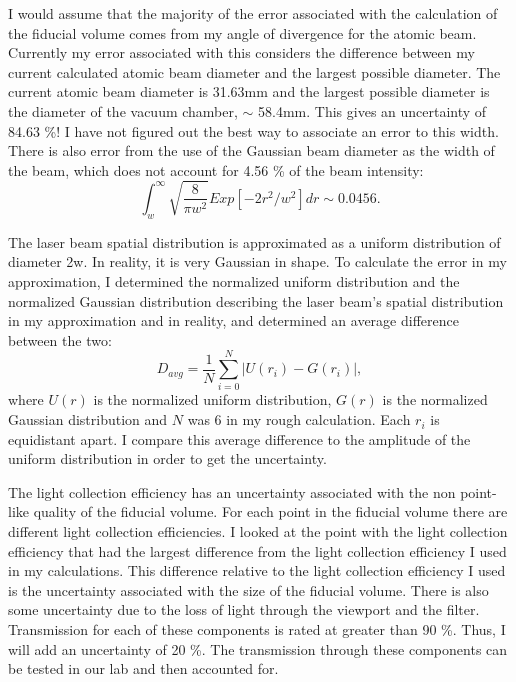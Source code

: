 \documentclass[12pt, a4paper]{article}
\begin{document}
I would assume that the majority of the error associated with the calculation of the fiducial volume comes from my angle of divergence for the atomic beam. Currently my error associated with this considers the difference between my current calculated atomic beam diameter and the largest possible diameter. The current atomic beam diameter is 31.63mm and the largest possible diameter is the diameter of the vacuum chamber, $\sim$ 58.4mm. This gives an uncertainty of 84.63 \%! I have not figured out the best way to associate an error to this width. There is also error from the use of the Gaussian beam diameter as the width of the beam, which does not account for 4.56 \% of the beam intensity:
\begin{equation}
\int_{w}^{\infty} \sqrt{\frac{8}{\pi w^2}} Exp[-2r^2/w^2]dr \sim 0.0456.
\end{equation}

The laser beam spatial distribution is approximated as a uniform distribution of diameter 2w. In reality, it is very Gaussian in shape. To calculate the error in my approximation, I determined the normalized uniform distribution and the normalized Gaussian distribution describing the laser beam's spatial distribution in my approximation and in reality, and determined an average difference between the two:
\begin{equation}
D_{avg}=\frac{1}{N}\sum_{i=0}^{N}{|U(r_i)-G(r_i)|},
\end{equation}
where $U(r)$ is the normalized uniform distribution, $G(r)$ is the normalized Gaussian distribution and $N$ was 6 in my rough calculation. Each $r_i$ is equidistant apart. I compare this average difference to the amplitude of the uniform distribution in order to get the uncertainty.

The light collection efficiency has an uncertainty associated with the non point-like quality of the fiducial volume. For each point in the fiducial volume there are different light collection efficiencies. I looked at the point with the light collection efficiency that had the largest difference from the light collection efficiency I used in my calculations. This difference relative to the light collection efficiency I used is the uncertainty associated with the size of the fiducial volume. There is also some uncertainty due to the loss of light through the viewport and the filter. Transmission for each of these components is rated at greater than 90 \%. Thus, I will add an uncertainty of 20 \%. The transmission through these components can be tested in our lab and then accounted for. 
\end{document}
